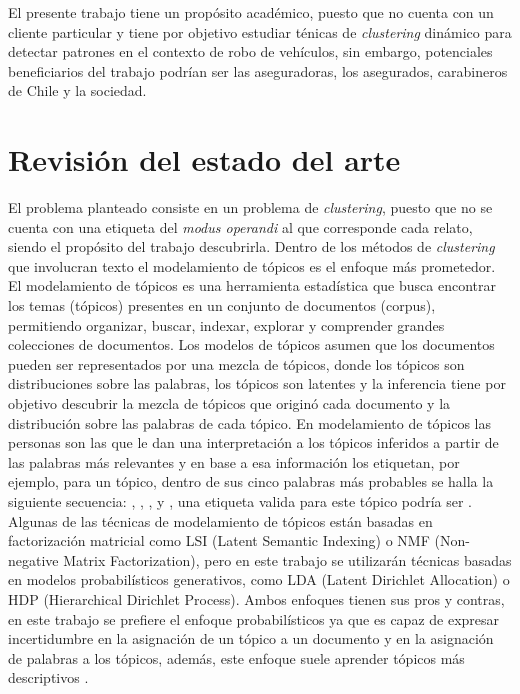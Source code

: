 \documentclass[letterpaper,12pt,oneside]{book} %
\begin{document}
El presente trabajo tiene un propósito académico, puesto que no cuenta con un cliente particular y tiene por objetivo estudiar ténicas de \textit{clustering} dinámico para detectar patrones en el contexto de robo de vehículos, sin embargo, potenciales beneficiarios del trabajo podrían ser las aseguradoras, los asegurados, carabineros de Chile y la sociedad.

\chapter{Revisión del estado del arte}

El problema planteado consiste en un problema de \textit{clustering}, puesto que no se cuenta con una etiqueta del \textit{modus operandi} al que corresponde cada relato, siendo el propósito del trabajo descubrirla. Dentro de los métodos de \textit{clustering} que involucran texto el modelamiento de tópicos es el enfoque más prometedor.%
El modelamiento de tópicos es una herramienta estadística que busca encontrar los temas (tópicos) presentes en un conjunto de documentos (corpus), permitiendo organizar, buscar, indexar, explorar y comprender grandes colecciones de documentos. %
Los modelos de tópicos asumen que los documentos pueden ser representados por una mezcla de tópicos, donde los tópicos son distribuciones sobre las palabras, los tópicos son latentes y la inferencia tiene por objetivo descubrir la mezcla de tópicos que originó cada documento y la distribución sobre las palabras de cada tópico. En modelamiento de tópicos las personas son las que le dan una interpretación a los tópicos inferidos a partir de las palabras más relevantes y en base a esa información los etiquetan, por ejemplo, para un tópico, dentro de sus cinco palabras más probables se halla la siguiente secuencia: , , ,  y , una etiqueta valida para este tópico podría ser .\\

Algunas de las técnicas de modelamiento de tópicos están basadas en factorización matricial como LSI (Latent Semantic Indexing) \citep{dumais2004latent} o NMF (Non-negative Matrix Factorization)\citep{xu2003document}, pero en este trabajo se utilizarán técnicas basadas en modelos probabilísticos generativos, como LDA (Latent Dirichlet Allocation)\citep{blei2003latent} o HDP (Hierarchical Dirichlet Process)\citep{teh2005sharing}. Ambos enfoques tienen sus pros y contras, en este trabajo se prefiere el enfoque probabilísticos ya que es capaz de expresar incertidumbre en la asignación de un tópico a un documento y en la asignación de palabras a los tópicos, además, este enfoque suele aprender tópicos más descriptivos \citep{stevens2012exploring}.\\
\end{document}
